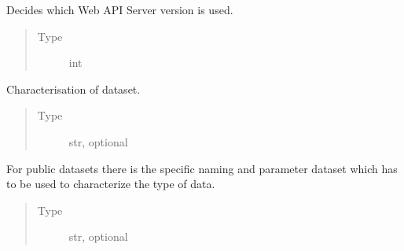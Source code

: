 \documentclass[letterpaper,10pt,english]{sphinxmanual}
\begin{document}
\begin{fulllineitems}
\begin{fulllineitems}
\end{fulllineitems}


\begin{fulllineitems}
\label{\detokenize{api:MarsRetrieval.MarsRetrieval.public}}
Decides which Web API Server version is used.
\begin{quote}\begin{description}
\item[{Type}] \leavevmode
int

\end{description}\end{quote}

\end{fulllineitems}


\begin{fulllineitems}
\label{\detokenize{api:MarsRetrieval.MarsRetrieval.marsclass}}
Characterisation of dataset.
\begin{quote}\begin{description}
\item[{Type}] \leavevmode
str, optional

\end{description}\end{quote}

\end{fulllineitems}


\begin{fulllineitems}
\label{\detokenize{api:MarsRetrieval.MarsRetrieval.dataset}}
For public datasets there is the specific naming and parameter
dataset which has to be used to characterize the type of
data.
\begin{quote}\begin{description}
\item[{Type}] \leavevmode
str, optional

\end{description}\end{quote}


\end{fulllineitems}
\end{fulllineitems}
\end{document}
